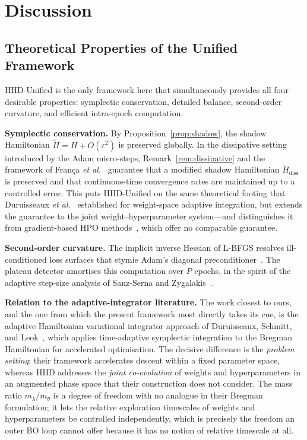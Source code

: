 \documentclass[11pt]{article}
\theoremstyle{definition}
\newcommand{\tHH}{\widetilde{H}}
\begin{document}

\section{Discussion}

\subsection{Theoretical Properties of the Unified Framework}

HHD-Unified is the only framework here that simultaneously provides all
four desirable properties: symplectic conservation, detailed
balance, second-order curvature, and efficient intra-epoch
computation.

\textbf{Symplectic conservation.} By
Proposition~\ref{prop:shadow}, the shadow Hamiltonian
$\tHH=H+O(\varepsilon^2)$ is preserved globally. In the dissipative
setting introduced by the Adam micro-steps,
Remark~\ref{rem:dissipative} and the framework of Fran\c{c}a \emph{et
al.}~\cite{franca2021dissipative} guarantee that a modified shadow
Hamiltonian $\tHH_{\mathrm{diss}}$ is preserved and that
continuous-time convergence rates are maintained up to a controlled
error. This puts HHD-Unified on the same theoretical footing that
Duruisseaux \emph{et al.}~\cite{duruisseaux2021adaptive} established
for weight-space adaptive integration, but extends the guarantee to
the joint weight--hyperparameter system---and distinguishes it from
gradient-based HPO
methods~\cite{lorraine2020millions,franceschi2018bilevel}, which
offer no comparable guarantee.

\textbf{Second-order curvature.} The implicit inverse Hessian of
L-BFGS resolves ill-conditioned loss surfaces that stymie Adam's
diagonal preconditioner~\cite{liu1989lbfgs}. The plateau detector
amortises this computation over $P$ epochs, in the spirit of the
adaptive step-size analysis of Sanz-Serna and
Zygalakis~\cite{sanzserna2021lyapunov}.

\textbf{Relation to the adaptive-integrator literature.} The work
closest to ours, and the one from which the present framework most
directly takes its cue, is the adaptive Hamiltonian variational
integrator approach of Duruisseaux, Schmitt, and
Leok~\cite{duruisseaux2021adaptive,duruisseaux2022variational},
which applies time-adaptive symplectic integration to the Bregman
Hamiltonian for accelerated optimisation. The decisive difference is
the \emph{problem setting}: their framework accelerates descent
within a fixed parameter space, whereas HHD addresses the
\emph{joint co-evolution} of weights and hyperparameters in an
augmented phase space that their construction does not consider. The
mass ratio $m_\lambda/m_\theta$ is a degree of freedom with no analogue
in their Bregman formulation; it lets the relative exploration
timescales of weights and hyperparameters be controlled
independently, which is precisely the freedom an outer BO loop cannot
offer because it has no notion of relative timescale at all.
\end{document}
